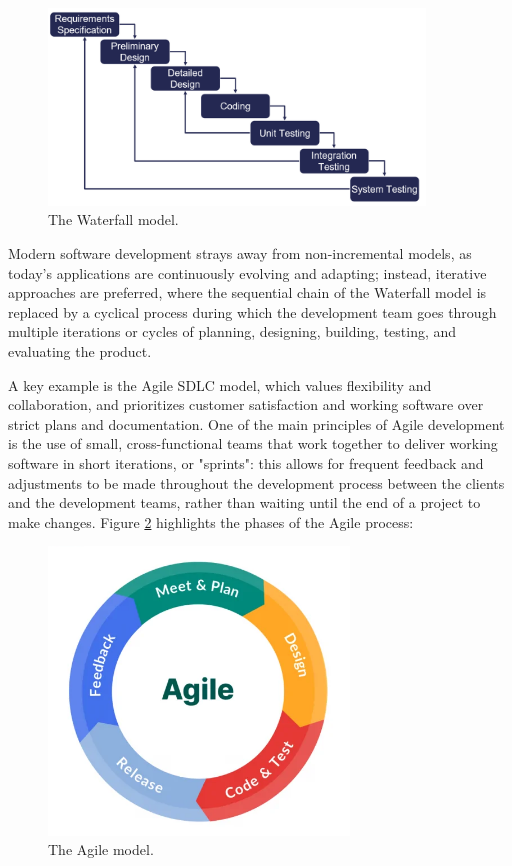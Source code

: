 \begin{figure}[H]
    \centering
    \includegraphics[width=10cm, scale=0.5]{figures/waterfall_model.png}
    \caption{The Waterfall model.}
    \label{waterfall_model}
\end{figure}

Modern software development strays away from non-incremental models, as today's applications are continuously evolving and adapting; instead, iterative approaches are preferred, where the sequential chain of the Waterfall model is replaced by a cyclical process during which the development team goes through multiple iterations or cycles of planning, designing, building, testing, and evaluating the product.

A key example is the Agile SDLC model, which values flexibility and collaboration, and prioritizes customer satisfaction and working software over strict plans and documentation. One of the main principles of Agile development is the use of small, cross-functional teams that work together to deliver working software in short iterations, or "sprints": this allows for frequent feedback and adjustments to be made throughout the development process between the clients and the development teams, rather than waiting until the end of a project to make changes.
Figure \ref{agile_model} highlights the phases of the Agile process:

\begin{figure}[h]
    \centering
    \includegraphics[width=8cm, scale=0.2]{figures/agile_model.jpg}
    \caption{The Agile model.}
    \label{agile_model}
\end{figure}

